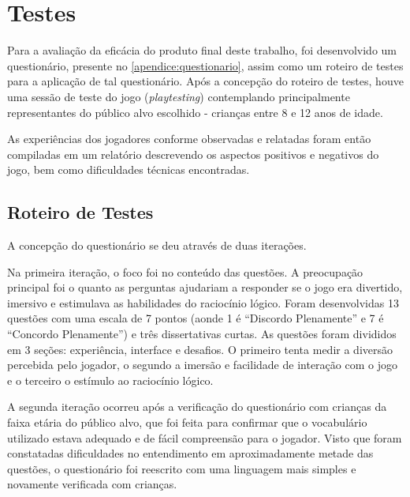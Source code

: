 
\chapter{Testes}\label{cap-testes}

Para a avaliação da eficácia do produto final deste trabalho, foi
desenvolvido um questionário, presente no \autoref{apendice:questionario}, 
assim como um roteiro de testes para a aplicação de tal 
questionário. Após a concepção do roteiro de testes, houve 
uma sessão de teste do jogo (\textit{playtesting}) contemplando 
principalmente representantes do público alvo escolhido - crianças 
entre 8 e 12 anos de idade.

As experiências dos jogadores conforme observadas e relatadas foram 
então compiladas em um relatório descrevendo os aspectos positivos e negativos 
do jogo, bem como dificuldades técnicas encontradas.

\section{Roteiro de Testes}\label{sec-roteiro-testes}

A concepção do questionário se deu através de duas iterações.

Na primeira iteração, o foco foi no conteúdo das questões. A 
preocupação principal foi o quanto as perguntas ajudariam a 
responder se o jogo era divertido, imersivo e estimulava as 
habilidades do raciocínio lógico. Foram desenvolvidas 13 questões 
com uma escala de 7 pontos (aonde 1 é ``Discordo Plenamente'' e 7 
é ``Concordo Plenamente'') e três dissertativas curtas. As questões 
foram divididos em 3 seções: experiência, interface e desafios. 
O primeiro tenta medir a diversão percebida pelo jogador, o segundo 
a imersão e facilidade de interação com o jogo e o terceiro o 
estímulo ao raciocínio lógico.

A segunda iteração ocorreu após a verificação do questionário com 
crianças da faixa etária do público alvo, que foi feita para 
confirmar que o vocabulário utilizado estava adequado e de fácil 
compreensão para o jogador. Visto que foram constatadas 
dificuldades no entendimento em aproximadamente metade das 
questões, o questionário foi reescrito com uma linguagem mais 
simples e novamente verificada com crianças.

